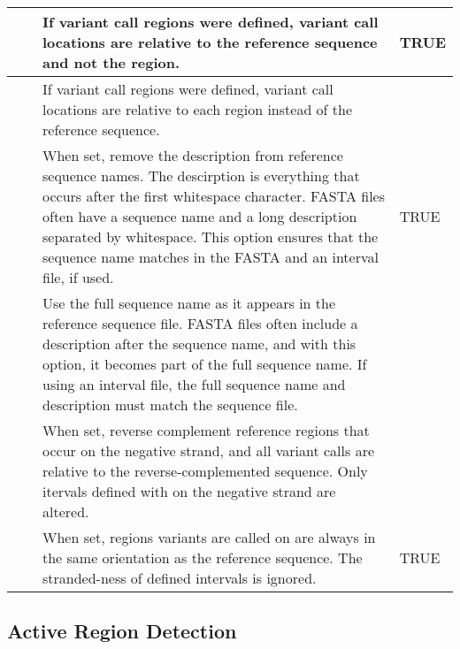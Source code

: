 \begin{small}
\begin{longtable}{|p{\optwidth}|p{\argwidth}|p{\dscwidth}|p{}|}
		\lopt{byreference} & &
		If variant call regions were defined, variant call locations are relative to the reference sequence and not the region.
		& TRUE
		\\ \hline
		
		\lopt{byregion} & &
		If variant call regions were defined, variant call locations are relative to each region instead of the reference sequence.
		&
		\\ \hline
		
		\lopt{rmrefdesc} & &
		When set, remove the description from reference sequence names. The descirption is everything that occurs after the first whitespace character. FASTA files often have a sequence name and a long description separated by whitespace. This option ensures that the sequence name matches in the FASTA and an interval file, if used.
		& TRUE
		\\ \hline
		
		\lopt{normrefdesc} & &
		Use the full sequence name as it appears in the reference sequence file. FASTA files often include a description after the sequence name, and with this option, it becomes part of the full sequence name. If using an interval file, the full sequence name and description must match the sequence file.
		&
		\\ \hline
		
		\lopt{revregion} & &
		When set, reverse complement reference regions that occur on the negative strand, and all variant calls are relative to the reverse-complemented sequence. Only itervals defined with on the negative strand are altered.
		&
		\\ \hline
		
		\lopt{norevregion} & &
		When set, regions variants are called on are always in the same orientation as the reference sequence. The stranded-ness of defined intervals is ignored.
		& TRUE
		\\ \hline
		
	\end{longtable}
\end{small}



\subsection{Active Region Detection}
\label{sec.cmdline.opts.ardetect}

